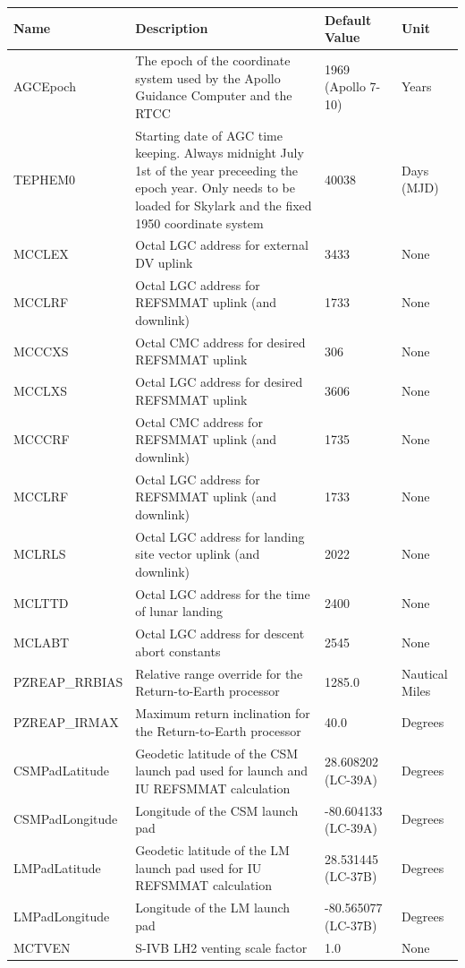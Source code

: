\documentclass[11pt]{article} %
\begin{document}
\begin{tabular}{L{3cm} L{7.5cm} L{2cm} L{1.5cm}}
\hline
\textbf{Name} & \textbf{Description} & \textbf{Default Value} & \textbf{Unit}\\
\hline
AGCEpoch & The epoch of the coordinate system used by the Apollo Guidance Computer and the RTCC& 1969 (Apollo 7-10) & Years\\
\hline
TEPHEM0 & Starting date of AGC time keeping. Always midnight July 1st of the year preceeding the epoch year. Only needs to be loaded for Skylark and the fixed 1950 coordinate system & 40038 & Days (MJD)\\
\hline
MCCLEX & Octal LGC address for external DV uplink & 3433 & None\\
\hline
MCCLRF & Octal LGC address for REFSMMAT uplink (and downlink)& 1733 & None\\
\hline
MCCCXS & Octal CMC address for desired REFSMMAT uplink & 306 & None\\
\hline
MCCLXS & Octal LGC address for desired REFSMMAT uplink & 3606 & None\\
\hline
MCCCRF & Octal CMC address for REFSMMAT uplink (and downlink) & 1735 & None\\
\hline
MCCLRF & Octal LGC address for REFSMMAT uplink (and downlink) & 1733 & None\\
\hline
MCLRLS & Octal LGC address for landing site vector uplink (and downlink) & 2022 & None\\
\hline
MCLTTD & Octal LGC address for the time of lunar landing & 2400 & None\\
\hline
MCLABT & Octal LGC address for descent abort constants & 2545 & None\\
\hline
PZREAP\_RRBIAS & Relative range override for the Return-to-Earth processor & 1285.0 & Nautical Miles\\
\hline
PZREAP\_IRMAX & Maximum return inclination for the Return-to-Earth processor & 40.0 & Degrees\\
\hline
CSMPadLatitude & Geodetic latitude of the CSM launch pad used for launch and IU REFSMMAT calculation & 28.608202 (LC-39A) & Degrees\\
\hline
CSMPadLongitude & Longitude of the CSM launch pad & -80.604133 (LC-39A) & Degrees\\
\hline
LMPadLatitude & Geodetic latitude of the LM launch pad used for IU REFSMMAT calculation & 28.531445 (LC-37B) & Degrees\\
\hline
LMPadLongitude & Longitude of the LM launch pad & -80.565077 (LC-37B) & Degrees\\
\hline
MCTVEN & S-IVB LH2 venting scale factor & 1.0 & None\\
\hline
\end{tabular}
\end{document}
